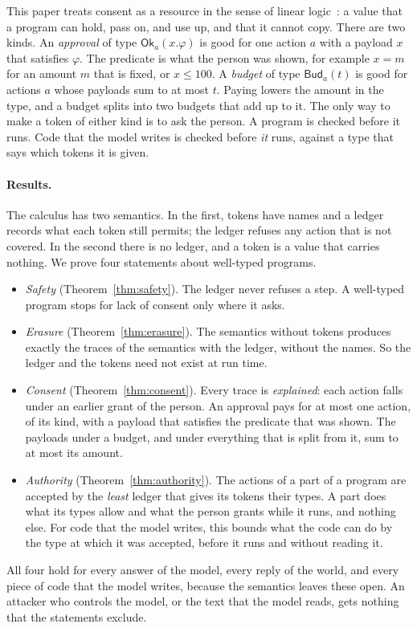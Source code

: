 \documentclass[acmsmall,nonacm,screen]{acmart}
\newcommand{\kw}[1]{\mathsf{#1}}
\newcommand{\Ok}[2]{\kw{Ok}_{#1}(#2)}
\newcommand{\Bud}[2]{\kw{Bud}_{#1}(#2)}
\begin{document}
This paper treats consent as a resource in the sense of linear logic~\citep{girard1987}: a
value that a program can hold, pass on, and use up, and that it cannot copy. There are two
kinds. An \emph{approval} of type $\Ok{a}{x.\varphi}$ is good for one action $a$ with a
payload $x$ that satisfies $\varphi$. The predicate is what the person was shown, for example
$x = m$ for an amount $m$ that is fixed, or $x \le 100$. A \emph{budget} of type $\Bud{a}{t}$
is good for actions $a$ whose payloads sum to at most $t$. Paying lowers the amount in the
type, and a budget splits into two budgets that add up to it. The only way to make a token of
either kind is to ask the person. A program is checked before it runs. Code that the model
writes is checked before \emph{it} runs, against a type that says which tokens it is given.

\paragraph{Results.} The calculus has two semantics. In the first, tokens have names and a
ledger records what each token still permits; the ledger refuses any action that is not
covered. In the second there is no ledger, and a token is a value that carries nothing. We
prove four statements about well-typed programs.
\begin{itemize}
\item \emph{Safety} (Theorem~\ref{thm:safety}). The ledger never refuses a step. A well-typed
  program stops for lack of consent only where it asks.
\item \emph{Erasure} (Theorem~\ref{thm:erasure}). The semantics without tokens produces
  exactly the traces of the semantics with the ledger, without the names. So the ledger and the
  tokens need not exist at run time.
\item \emph{Consent} (Theorem~\ref{thm:consent}). Every trace is \emph{explained}: each action
  falls under an earlier grant of the person. An approval pays for at most one action, of its
  kind, with a payload that satisfies the predicate that was shown. The payloads under a
  budget, and under everything that is split from it, sum to at most its amount.
\item \emph{Authority} (Theorem~\ref{thm:authority}). The actions of a part of a program are
  accepted by the \emph{least} ledger that gives its tokens their types. A part does what its
  types allow and what the person grants while it runs, and nothing else. For code that the
  model writes, this bounds what the code can do by the type at which it was accepted, before
  it runs and without reading it.
\end{itemize}
All four hold for every answer of the model, every reply of the world, and every piece of code
that the model writes, because the semantics leaves these open. An attacker who controls the
model, or the text that the model reads, gets nothing that the statements exclude.
\end{document}
